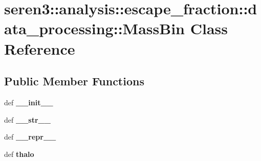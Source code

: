 \hypertarget{classseren3_1_1analysis_1_1escape__fraction_1_1data__processing_1_1MassBin}{
\section{seren3::analysis::escape\_\-fraction::data\_\-processing::MassBin Class Reference}
\label{classseren3_1_1analysis_1_1escape__fraction_1_1data__processing_1_1MassBin}
}
\subsection*{Public Member Functions}
\begin{DoxyCompactItemize}
\item 
\hypertarget{classseren3_1_1analysis_1_1escape__fraction_1_1data__processing_1_1MassBin_a02a7cff128d4bf3724a3fe5023db8220}{
def {\bfseries \_\-\_\-init\_\-\_\-}}
\label{classseren3_1_1analysis_1_1escape__fraction_1_1data__processing_1_1MassBin_a02a7cff128d4bf3724a3fe5023db8220}

\item 
\hypertarget{classseren3_1_1analysis_1_1escape__fraction_1_1data__processing_1_1MassBin_a4fc0ad0d7e77f4b5627eeab9d2d600a0}{
def {\bfseries \_\-\_\-str\_\-\_\-}}
\label{classseren3_1_1analysis_1_1escape__fraction_1_1data__processing_1_1MassBin_a4fc0ad0d7e77f4b5627eeab9d2d600a0}

\item 
\hypertarget{classseren3_1_1analysis_1_1escape__fraction_1_1data__processing_1_1MassBin_ab28220962a0ea06c1b3fb3bc0625c671}{
def {\bfseries \_\-\_\-repr\_\-\_\-}}
\label{classseren3_1_1analysis_1_1escape__fraction_1_1data__processing_1_1MassBin_ab28220962a0ea06c1b3fb3bc0625c671}

\item 
\hypertarget{classseren3_1_1analysis_1_1escape__fraction_1_1data__processing_1_1MassBin_aa59f68d40558519a2526b971bfac6e3b}{
def {\bfseries thalo}}
\label{classseren3_1_1analysis_1_1escape__fraction_1_1data__processing_1_1MassBin_aa59f68d40558519a2526b971bfac6e3b}

\end{DoxyCompactItemize}
